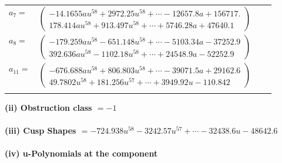 \documentclass[1p]{elsarticle_modified}
\theoremstyle{definition}
\begin{document}
\begin{tabular}{m{7pt} m{180pt} m{7pt} m{180pt} }
\flushright $a_{7}=$&$\begin{pmatrix}-14.1655 a u^{58}+2972.25 u^{58}+\cdots-12657.8 a+156717.\\178.414 a u^{58}+913.497 u^{58}+\cdots+5746.28 a+47640.1\end{pmatrix}$ \\
\flushright $a_{8}=$&$\begin{pmatrix}-179.259 a u^{58}-651.148 u^{58}+\cdots-5103.34 a-37252.9\\392.636 a u^{58}-1102.18 u^{58}+\cdots+24548.9 a-52252.9\end{pmatrix}$ \\
\flushright $a_{11}=$&$\begin{pmatrix}-676.688 a u^{58}+806.803 u^{58}+\cdots-39071.5 a+29162.6\\49.7802 u^{58}+181.256 u^{57}+\cdots+3949.92 u-110.842\end{pmatrix}$\\&\end{tabular}
\flushleft \textbf{(ii) Obstruction class $= -1$}\\~\\
\flushleft \textbf{(iii) Cusp Shapes $= -724.938 u^{58}-3242.57 u^{57}+\cdots-32438.6 u-48642.6$}\\~\\
\newpage\renewcommand{\arraystretch}{1}
\flushleft \textbf{(iv) u-Polynomials at the component}\newline \\
\end{document}

